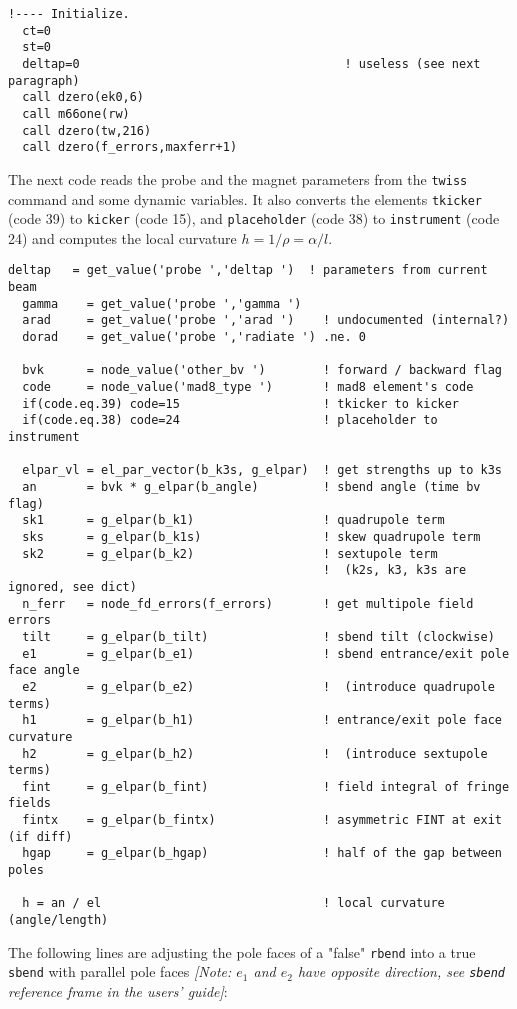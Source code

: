 \documentclass{cern-art} %
\renewcommand{\L}[1]{\lstinline[firstnumber=last]{#1}}
\begin{document}
\begin{lstlisting}[firstnumber=last]
  !---- Initialize.
  ct=0
  st=0
  deltap=0                                     ! useless (see next paragraph)
  call dzero(ek0,6)
  call m66one(rw)
  call dzero(tw,216)
  call dzero(f_errors,maxferr+1)
\end{lstlisting}
The next code reads the probe and the magnet parameters from the \L{twiss} command and some dynamic variables. It also converts the elements \L{tkicker} (code 39) to \L{kicker} (code 15), and \L{placeholder} (code 38) to \L{instrument} (code 24) and computes the local curvature $h=1/\rho=\alpha/l$.
\begin{lstlisting}[firstnumber=last]
  deltap   = get_value('probe ','deltap ')  ! parameters from current beam
  gamma    = get_value('probe ','gamma ')
  arad     = get_value('probe ','arad ')    ! undocumented (internal?)
  dorad    = get_value('probe ','radiate ') .ne. 0
  
  bvk      = node_value('other_bv ')        ! forward / backward flag
  code     = node_value('mad8_type ')       ! mad8 element's code
  if(code.eq.39) code=15                    ! tkicker to kicker
  if(code.eq.38) code=24                    ! placeholder to instrument

  elpar_vl = el_par_vector(b_k3s, g_elpar)  ! get strengths up to k3s
  an       = bvk * g_elpar(b_angle)         ! sbend angle (time bv flag)
  sk1      = g_elpar(b_k1)                  ! quadrupole term
  sks      = g_elpar(b_k1s)                 ! skew quadrupole term
  sk2      = g_elpar(b_k2)                  ! sextupole term
                                            !  (k2s, k3, k3s are ignored, see dict)
  n_ferr   = node_fd_errors(f_errors)       ! get multipole field errors
  tilt     = g_elpar(b_tilt)                ! sbend tilt (clockwise)
  e1       = g_elpar(b_e1)                  ! sbend entrance/exit pole face angle
  e2       = g_elpar(b_e2)                  !  (introduce quadrupole terms)
  h1       = g_elpar(b_h1)                  ! entrance/exit pole face curvature
  h2       = g_elpar(b_h2)                  !  (introduce sextupole terms)
  fint     = g_elpar(b_fint)                ! field integral of fringe fields
  fintx    = g_elpar(b_fintx)               ! asymmetric FINT at exit (if diff)
  hgap     = g_elpar(b_hgap)                ! half of the gap between poles

  h = an / el                               ! local curvature (angle/length)
\end{lstlisting}
The following lines are adjusting the pole faces of a "false" \L{rbend} into a true \L{sbend} with parallel pole faces {\em [Note: $e_1$ and $e_2$ have opposite direction, see \L{sbend} reference frame in the users' guide]}:
\end{document}
